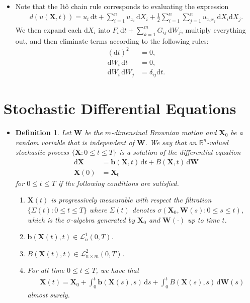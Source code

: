 \documentclass[10pt]{article}
\newtheorem{definition}[lemma]{Definition}
\newcommand{\dee}{\mathrm{d}}
\newcommand{\ve}[1]{\mathbf{#1}}
\newcommand{\mcal}[1]{\mathcal{#1}}
\newcommand{\Real}{\mathbb{R}}
\begin{document}
\begin{itemize}
  \item Note that the It\^{o} chain rule corresponds to evaluating the expression
  \begin{align*}
    d(u(\ve{X}, t)) = u_t\, \dee t + \sum_{i=1}^n u_{x_i}\, \dee X_i + \frac{1}{2} \sum_{i=1}^n \sum_{j=1}^n u_{x_i x_j}\, \dee X_i \dee X_j.
  \end{align*}
  We then expand each $\dee X_i$ into $F_i\, \dee t + \sum_{k=1}^m G_{ij}\, \dee W_j$, multiply everything out, and then eliminate terms according to the following rules:
  \begin{align*}
    (\dee t)^2 &= 0, \\
    \dee W_i\, \dee t &= 0, \\
    \dee W_i\, \dee W_j &= \delta_{ij} \dee t.
  \end{align*}
\end{itemize}

\section{Stochastic Differential Equations}

\begin{itemize}
  \item \begin{definition}
    Let $\ve{W}$ be the $m$-dimensinal Brownian motion and $\ve{X}_0$ be a random variable that is independent of $\ve{W}$. We say that an $\Real^n$-valued stochastic process $\{ \ve{X} : 0 \leq t \leq T \}$ is a solution of the differential equation
    \begin{align*}
      \dee\ve{X} &= \ve{b}(\ve{X},t)\, \dee t + B(\ve{X},t)\, \dee\ve{W} \\
      \ve{X}(0) &= \ve{X}_0
    \end{align*}        
    for $0 \leq t \leq T$ if the following conditions are satisfied.
    \begin{enumerate}      
      \item $\ve{X}(t)$ is progressively measurable with respect the filtration $\{ \Sigma(t) : 0 \leq t \leq T \}$ where $\Sigma(t)$ denotes $\sigma(\ve{X}_0, \ve{W}(s) : 0 \leq s \leq t)$, which is the $\sigma$-algebra generated by $\ve{X}_0$ and $\ve{W}(\cdot)$ up to time $t$.
      \item $\ve{b}(\ve{X}(t), t) \in \mcal{L}^1_n(0,T)$.
      \item $B(\ve{X}(t), t) \in \mcal{L}^2_{n \times m}(0,T)$.
      \item For all time $0 \leq t \leq T$, we have that
      \begin{align*}
        \ve{X}(t) = \ve{X}_0 + \int_0^t\ve{b}(\ve{X}(s), s)\, \dee s + \int_0^t B(\ve{X}(s), s)\, \dee\ve{W}(s)
      \end{align*}
      almost surely.
    \end{enumerate}
  \end{definition}  
\end{itemize}
\end{document}
